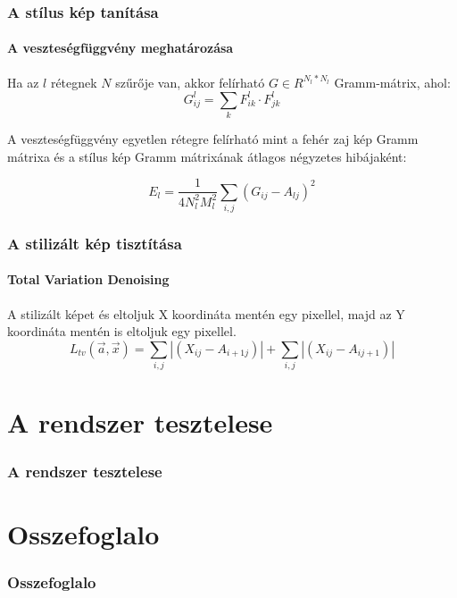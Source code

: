 \documentclass{beamer}
\begin{document}
	\begin{frame}
		\frametitle{A stílus kép tanítása}
		\framesubtitle{A veszteségfüggvény meghatározása}
		
		Ha az \(l\) rétegnek \(N\) szűrője van, akkor felírható \(G \in R^{N_l*N_l}\) Gramm-mátrix, ahol:
		\begin{equation}
			G^l_{ij} = \sum_{k} F^l_{ik} \cdot F^l_{jk}
		\end{equation}
		
		A veszteségfüggvény egyetlen rétegre felírható mint a fehér zaj kép Gramm mátrixa és a stílus kép Gramm mátrixának átlagos négyzetes hibájaként:
		 
		\begin{equation}
		E_l = \frac{1}{4N^2_l M^2_l} \sum_{i,j} (G_{ij} - A_{lj})^2
		\end{equation}
		
	\end{frame}

	\begin{frame}
		\frametitle{A stilizált kép tisztítása}
		\framesubtitle{Total Variation Denoising}
		
		A stilizált képet és eltoljuk X koordináta mentén egy pixellel, majd az Y koordináta mentén is eltoljuk egy pixellel.
		\begin{equation}
		L_{tv}(\vec{a}, \vec{x}) = \sum_{i,j} \left|(X_{ij} - A_{{i+1}j})\right| + \sum_{i, j} \left|(X_{ij} - A_{i {j+1}})\right|
		\end{equation}
		
	\end{frame}

	\section{A rendszer tesztelese}
	
	\begin{frame}
		\frametitle{A rendszer tesztelese}
	\end{frame}
	
	\section{Osszefoglalo}
	
	\begin{frame}
		\frametitle{Osszefoglalo}
	\end{frame}
	
	
\end{document}
